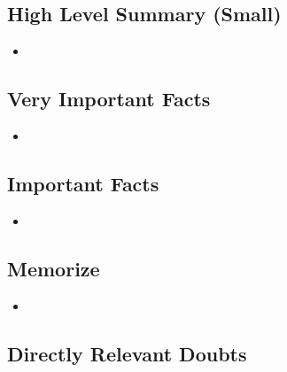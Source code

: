 \subsection{High Level Summary (Small)}

    \begin{itemize}

    \item 
    
    \end{itemize}

\subsection{Very Important Facts}

    \begin{itemize}

    \item 
    
    \end{itemize}

\subsection{Important Facts}

    \begin{itemize}

    \item 
    
    \end{itemize}

\subsection{Memorize}

    \begin{itemize}

    \item 
    
    \end{itemize}

\subsection*{Directly Relevant Doubts}

